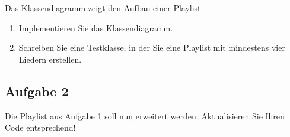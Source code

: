 \documentclass{bschlangaul-aufgabe}
\begin{document}
Das Klassendiagramm zeigt den Aufbau einer Playlist.

\begin{enumerate}
\item Implementieren Sie das Klassendiagramm.

\begin{bAntwort}


\end{bAntwort}

\item Schreiben Sie eine Testklasse, in der Sie eine Playlist mit
mindestens vier Liedern erstellen.

\begin{bAntwort}
\end{bAntwort}
\end{enumerate}

\subsection{Aufgabe 2}

Die Playlist aus Aufgabe 1 soll nun erweitert werden. Aktualisieren Sie
Ihren Code entsprechend!
\end{document}
